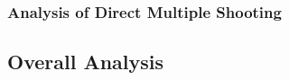 \documentclass[]{article}
\begin{document}
\FloatBarrier

\subsubsection{Analysis of Direct Multiple Shooting}
\subsection{Overall Analysis}
\end{document}
